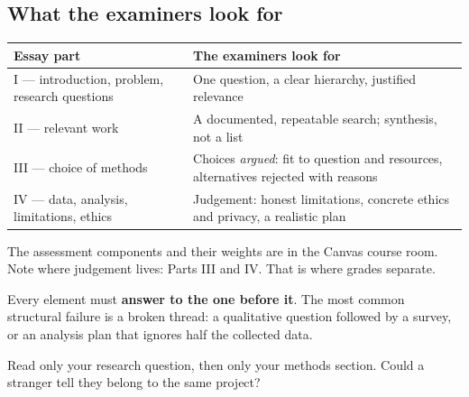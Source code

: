 \documentclass[11pt,a4paper,british,twoside=false,headings=small,chapterprefix=false,numbers=noenddot]{scrbook}
\newenvironment{block}[1]{\begin{tcolorbox}[scriptbox, title={#1}]}{\end{tcolorbox}}
\begin{document}
\subsection{What the examiners look for}
\begin{center}\small
\small
  \renewcommand{\arraystretch}{1.4}
  \begin{tabular}{@{}p{5.4cm}p{7.6cm}@{}}
    \toprule
    \textbf{Essay part} & \textbf{The examiners look for}\\
    \midrule
    I --- introduction, problem, research questions & One question, a clear hierarchy, justified relevance\\
    II --- relevant work & A documented, repeatable search; synthesis, not a list\\
    III --- choice of methods & Choices \emph{argued}: fit to question and resources, alternatives rejected with reasons\\
    IV --- data, analysis, limitations, ethics & Judgement: honest limitations, concrete ethics and privacy, a realistic plan\\
    \bottomrule
  \end{tabular}
  
  The assessment components and their weights are in the Canvas course
  room. Note where judgement
  lives: Parts III and IV. That is where grades separate.
\end{center}

\begin{center}\small
\begin{center}
  \end{center}
  
  Every element must \textbf{answer to the one before it}. The most common
  structural failure is a broken thread: a qualitative question followed by a
  survey, or an analysis plan that ignores half the collected data.
  
  \begin{block}{The reviewer's test --- apply it to your own draft}
    Read only your research question, then only your methods section.
    Could a stranger tell they belong to the same project?
  \end{block}
\end{center}
\end{document}

